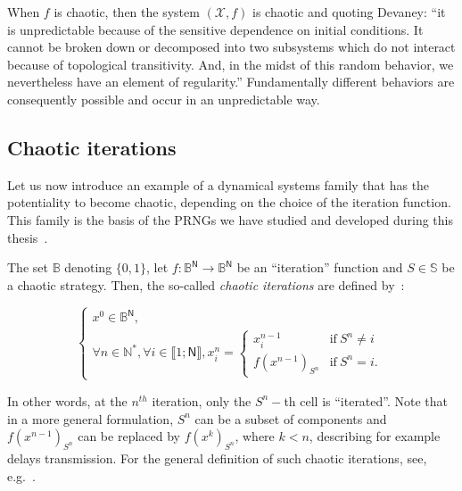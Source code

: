 When $f$ is chaotic, then the system $(\mathcal{X}, f)$ is chaotic and quoting Devaney: ``it is unpredictable because of the sensitive dependence on initial conditions. It cannot be broken down or decomposed into two subsystems which do not interact because of topological transitivity. And, in the midst of this random behavior, we nevertheless have an element of regularity.'' Fundamentally different behaviors are consequently possible and occur in an unpredictable way.






\subsection{Chaotic iterations}
\label{subsection:Chaotic iterations}

Let us now introduce an example of a dynamical systems family that has
the potentiality to become chaotic, depending on the choice of the iteration 
function. This family is the basis of the PRNGs we have studied and
developed during this thesis~\cite{GuyeuxThese10,bibtexwangqianxue}.

\begin{definition}
\label{Chaotic iterations}
The set $\mathds{B}$ denoting $\{0,1\}$, let $f:\mathds{B}^{\mathsf{N}%
}\longrightarrow \mathds{B}^{\mathsf{N}}$ be an ``iteration'' function and $S\in \mathbb{S}
$ be a chaotic strategy. Then, the so-called \emph{chaotic iterations} are defined by~\cite{Robert1986}:

\begin{equation}
\left\{\begin{array}{l}
x^0\in \mathds{B}^{\mathsf{N}}, \\
\forall n\in \mathds{N}^{\ast },\forall i\in \llbracket1;\mathsf{N}\rrbracket%
,x_i^n=
\left\{
\begin{array}{ll}
x_i^{n-1} & \text{if}~S^n\neq i \\
f(x^{n-1})_{S^n}  & \text{if}~S^n=i.
\end{array} 
\right. 
\end{array}
\right.
\end{equation}
\end{definition}

In other words, at the $n^{th}$ iteration, only the $S^{n}-$th cell is
\textquotedblleft iterated\textquotedblright . Note that in a more general
formulation, $S^n$ can be a subset of components and $f(x^{n-1})_{S^{n}}$ can
be replaced by $f(x^{k})_{S^{n}}$, where $k < n$, describing for
example delays transmission. For the
general definition of such chaotic iterations, see, e.g.~\cite{Robert1986}.

